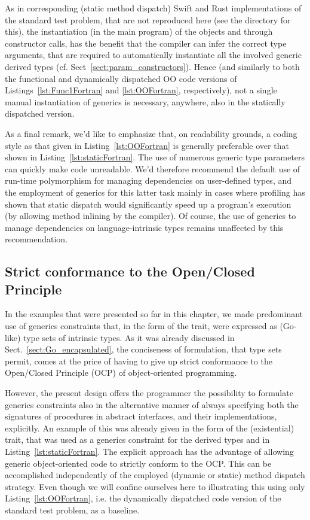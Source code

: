 \documentclass[11pt,oneside]{report}
\newcommand{\code}[1]{{\selectfont\ttfamily{#1}}}
\begin{document}
As in corresponding (static method dispatch) Swift and Rust
implementations of the standard test problem, that are not reproduced
here (see the \code{Code} directory for this), the
instantiation (in the main program) of the objects \code{other} and
\code{drv} through constructor calls, has the benefit that the
compiler can infer the correct type arguments, that are required to
automatically instantiate all the involved generic derived types
(cf. Sect~\ref{sect:param_constructors}). Hence (and similarly to both
the functional and dynamically dispatched OO code versions of
Listings~\ref{lst:Func1Fortran} and \ref{lst:OOFortran},
respectively), not a single manual instantiation of generics is
necessary, anywhere, also in the statically dispatched version.

As a final remark, we'd like to emphasize that, on readability
grounds, a coding style as that given in Listing~\ref{lst:OOFortran}
is generally preferable over that shown in
Listing~\ref{lst:staticFortran}. The use of numerous generic type
parameters can quickly make code unreadable. We'd therefore recommend
the default use of run-time polymorphism for managing dependencies on
user-defined types, and the employment of generics for this latter
task mainly in cases where profiling has shown that static dispatch
would significantly speed up a program's execution (by allowing method
inlining by the compiler). Of course, the use of generics to manage
dependencies on language-intrinsic types remains unaffected by this
recommendation.


\subsection{Strict conformance to the Open/Closed Principle}
\label{sect:ocp_conformance}

In the examples that were presented so far in this chapter, we made
predominant use of generics constraints that, in the form of the
\code{INumeric} trait, were expressed as (Go-like) type sets of
intrinsic types. As it was already discussed in
Sect.~\ref{sect:Go_encapsulated}, the conciseness of formulation, that
type sets permit, comes at the price of having to give up strict
conformance to the Open/Closed Principle (OCP) of object-oriented
programming.

However, the present design offers the programmer the possibility to
formulate generics constraints also in the alternative manner of
always specifying both the signatures of procedures in abstract
interfaces, and their implementations, explicitly. An example of this
was already given in the form of the (existential) \code{ISum} trait,
that was used as a generics constraint for the derived types
\code{PairwiseSum} and \code{Averager} in
Listing~\ref{lst:staticFortran}. The explicit approach has the
advantage of allowing generic object-oriented code to strictly conform
to the OCP.  This can be accomplished independently of the employed
(dynamic or static) method dispatch strategy. Even though we will
confine ourselves here to illustrating this using only
Listing~\ref{lst:OOFortran}, i.e. the dynamically dispatched code
version of the standard test problem, as a baseline.
\end{document}
